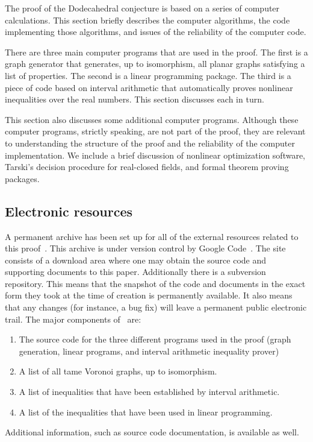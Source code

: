 \documentclass{article} %
\begin{document}
The proof of the Dodecahedral conjecture is based on a series of
computer calculations. This section briefly describes the computer
algorithms, the code implementing those algorithms, and issues of the
reliability of the computer code.

There are three main computer programs that are used in the proof. The
first is a graph generator that generates, up to isomorphism, all
planar graphs satisfying a list of properties. The second is a linear
programming package. The third is a piece of code based on interval
arithmetic that automatically proves nonlinear inequalities over the
real numbers. This section discusses each in turn.

This section also discusses some additional computer programs.
Although these computer programs, strictly speaking, are not part of
the proof, they are relevant to understanding the structure of the
proof and the reliability of the computer implementation. 
We include a brief discussion of nonlinear optimization software,
Tarski's decision procedure for real-closed fields, and formal theorem
proving packages.

\subsection{Electronic resources}

A permanent archive has been set up for all of the external resources
related to this proof~\cite{McLaughlin:2008:KeplerCode}. This archive
is under version control by Google Code~\cite{website:GoogleCode}. The
site consists of a download area where one may obtain the source code
and supporting documents to this paper. Additionally there is a
subversion~\cite{CollinsSussman:2005:Subversion} repository. This
means that the snapshot of the code and documents in the exact form
they took at the time of creation is permanently available. It
also means that any changes (for instance, a bug fix) will leave a
permanent public electronic trail. The major components
of~\cite{McLaughlin:2008:KeplerCode} are:
\begin{enumerate}
\item The source code for the three different programs used in the proof (graph generation, linear programs, and interval arithmetic inequality prover)
\item A list of all tame Voronoi graphs, up to isomorphism.
\item A list of inequalities that have been established by interval arithmetic.
\item  A list of the inequalities that have been used in linear programming.
\end{enumerate}
Additional information, such as source code documentation, is available
as well.
\end{document}
